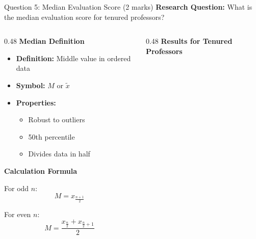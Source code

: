 \documentclass[aspectratio=169]{beamer}
\begin{document}
\begin{frame}{Question 5: Median Evaluation Score (2 marks)}
    \textbf{Research Question:} What is the median evaluation score for tenured professors?

    \vspace{0.5cm}

    \begin{columns}[T]
        \begin{column}{0.48\textwidth}
            \textbf{Median Definition}

            \begin{itemize}
                \item \textbf{Definition:} Middle value in ordered data
                \item \textbf{Symbol:} $M$ or $\tilde{x}$
                \item \textbf{Properties:}
                    \begin{itemize}
                        \item Robust to outliers
                        \item 50th percentile
                        \item Divides data in half
                    \end{itemize}
            \end{itemize}

            \vspace{0.3cm}

            \textbf{Calculation Formula}

            For odd $n$:
            \[
            M = x_{\frac{n+1}{2}}
            \]

            For even $n$:
            \[
            M = \frac{x_{\frac{n}{2}} + x_{\frac{n}{2}+1}}{2}
            \]
        \end{column}

        \begin{column}{0.48\textwidth}
            \textbf{Results for Tenured Professors}


\end{column}
\end{columns}
\end{frame}
\end{document}

